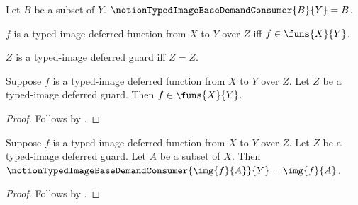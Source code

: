 

\begin{definition}\label{notion_typed_image_base_demand_consumer}
    Let $B$ be a subset of $Y$.
    $\notionTypedImageBaseDemandConsumer{B}{Y}=B$.
\end{definition}

\begin{definition}\label{notion_typed_image_deferred_function}
    $f$ is a typed-image deferred function from $X$ to $Y$ over $Z$ iff
        $f\in\funs{X}{Y}$.
\end{definition}

\begin{definition}\label{notion_typed_image_deferred_guard}
    $Z$ is a typed-image deferred guard iff $Z=Z$.
\end{definition}

\begin{classification}\label{notion_typed_image_deferred_result}
    Suppose $f$ is a typed-image deferred function from $X$ to $Y$ over $Z$.
    Let $Z$ be a typed-image deferred guard.
    Then $f\in\funs{X}{Y}$.
\end{classification}
\begin{proof}
    Follows by .
\end{proof}

\begin{proposition}\label{notion_typed_image_base_demand}
    Suppose $f$ is a typed-image deferred function from $X$ to $Y$ over $Z$.
    Let $Z$ be a typed-image deferred guard.
    Let $A$ be a subset of $X$.
    Then $\notionTypedImageBaseDemandConsumer{\img{f}{A}}{Y}=\img{f}{A}$.
\end{proposition}
\begin{proof}
    Follows by .
\end{proof}
